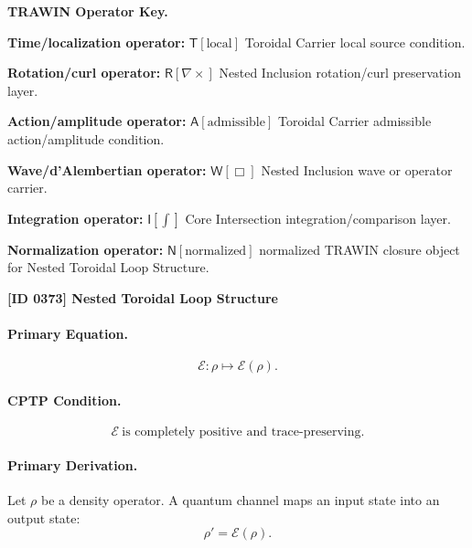 \par\vspace{0.45\baselineskip}
\noindent\begin{minipage}[t]{\linewidth}
\begingroup
\small
\raggedright
\textbf{TRAWIN Operator Key.}\par
\noindent\textbf{Time/localization operator:} $\mathsf{T}\!\left[\mathrm{local}\right]$ Toroidal Carrier local source condition.\par
\noindent\textbf{Rotation/curl operator:} $\mathsf{R}\!\left[\nabla\times\right]$ Nested Inclusion rotation/curl preservation layer.\par
\noindent\textbf{Action/amplitude operator:} $\mathsf{A}\!\left[\mathrm{admissible}\right]$ Toroidal Carrier admissible action/amplitude condition.\par
\noindent\textbf{Wave/d'Alembertian operator:} $\mathsf{W}\!\left[\Box\right]$ Nested Inclusion wave or operator carrier.\par
\noindent\textbf{Integration operator:} $\mathsf{I}\!\left[\int\right]$ Core Intersection integration/comparison layer.\par
\noindent\textbf{Normalization operator:} $\mathsf{N}\!\left[\mathrm{normalized}\right]$ normalized TRAWIN closure object for Nested Toroidal Loop Structure.\par
\endgroup
\end{minipage}

\clearpage
\noindent\textbf{[ID 0373] Nested Toroidal Loop Structure}\par
\vspace{0.35em}
\paragraph{Primary Equation.}
\begin{equation}
\mathcal{E}:\rho\mapsto \mathcal{E}(\rho).
\end{equation}

\paragraph{CPTP Condition.}
\begin{equation}
\mathcal{E}\ \text{is completely positive and trace-preserving}.
\end{equation}

\paragraph{Primary Derivation.}
Let $\rho$ be a density operator. A quantum channel maps an input state into an output state:
\begin{equation}
\rho'=\mathcal{E}(\rho).
\end{equation}

